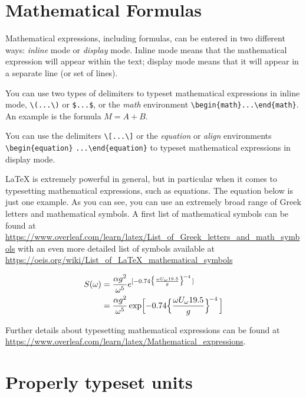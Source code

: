 \documentclass[11pt,twoside,openright]{report}
\begin{document}
\section{Mathematical Formulas}

Mathematical expressions, including formulas, can be entered in two different ways: \emph{inline} mode or \emph{display} mode. Inline mode means that the mathematical expression will appear within the text; display mode means that it will appear in a separate line (or set of lines).

You can use two types of delimiters to typeset mathematical expressions in inline mode, \verb|\(...\)| or \verb|$...$|, or the \emph{math} environment \verb|\begin{math}...\end{math}|. 
An example is the formula $M = A + B$.

You can use the delimiters \verb|\[...\]| or the \emph{equation} or \emph{align} environments \verb|\begin{equation}| \verb|...\end{equation}| to typeset mathematical expressions in display mode.

\LaTeX{} is extremely powerful in general, but in particular when it comes to typesetting mathematical expressions, such as equations. The equation below is just one example. As you can see, you can use an extremely broad range of Greek letters and mathematical symbols. A first list of mathematical symbols can be found at \url{https://www.overleaf.com/learn/latex/List_of_Greek_letters_and_math_symbols} with an even more detailed list of symbols available at  \url{https://oeis.org/wiki/List_of_LaTeX_mathematical_symbols} 

\begin{align*}
S(\omega) 
&= \frac{\alpha g^2}{\omega^5} e^{[ -0.74\bigl\{\frac{\omega U_\omega 19.5}{g}\bigr\}^{\!-4}\,]} \\
&= \frac{\alpha g^2}{\omega^5} \exp\Bigl[ -0.74\Bigl\{\frac{\omega U_\omega 19.5}{g}\Bigr\}^{\!-4}\,\Bigr] 
\end{align*}

Further details about typesetting mathematical expressions can be found at \url{https://www.overleaf.com/learn/latex/Mathematical_expressions}.

\section{Properly typeset units}
\end{document}
